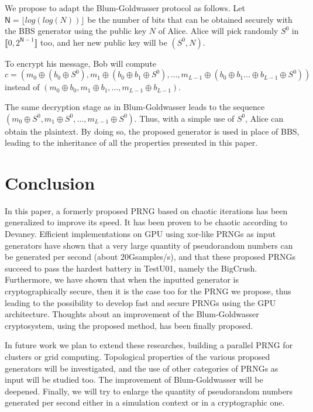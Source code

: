 \documentclass{article}
\begin{document}
We propose to adapt the Blum-Goldwasser protocol as follows. 
Let $\mathsf{N} = \lfloor log(log(N)) \rfloor$ be the number of bits that can
be obtained securely with the BBS generator using the public key $N$ of Alice.
Alice will pick randomly $S^0$ in $\llbracket 0, 2^{\mathsf{N}-1}\rrbracket$ too, and
her new public key will be $(S^0, N)$.

To encrypt his message, Bob will compute
\begin{equation}
c = \left(m_0 \oplus (b_0 \oplus S^0), m_1 \oplus (b_0 \oplus b_1 \oplus S^0), \hdots, m_{L-1} \oplus (b_0 \oplus b_1 \hdots \oplus b_{L-1} \oplus S^0) \right)
\end{equation}
instead of $\left(m_0 \oplus b_0, m_1 \oplus b_1, \hdots, m_{L-1} \oplus b_{L-1} \right)$. 

The same decryption stage as in Blum-Goldwasser leads to the sequence 
$\left(m_0 \oplus S^0, m_1 \oplus S^0, \hdots, m_{L-1} \oplus S^0 \right)$.
Thus, with a simple use of $S^0$, Alice can obtain the plaintext.
By doing so, the proposed generator is used in place of BBS, leading to
the inheritance of all the properties presented in this paper.

\section{Conclusion}


In  this  paper, a formerly proposed PRNG based on chaotic iterations
has been generalized to improve its speed. It has been proven to be
chaotic according to Devaney.
Efficient implementations on  GPU using xor-like  PRNGs as input generators
have shown that a very large quantity of pseudorandom numbers can be generated per second (about
20Gsamples/s), and that these proposed PRNGs succeed to pass the hardest battery in TestU01,
namely the BigCrush.
Furthermore, we have shown that when the inputted generator is cryptographically
secure, then it is the case too for the PRNG we propose, thus leading to
the possibility to develop fast and secure PRNGs using the GPU architecture.
Thoughts about an improvement of the Blum-Goldwasser cryptosystem, using the 
proposed method, has been finally proposed.

In future  work we plan to extend these researches, building a parallel PRNG for  clusters or
grid computing. Topological properties of the various proposed generators will be investigated,
and the use of other categories of PRNGs as input will be studied too. The improvement
of Blum-Goldwasser will be deepened. Finally, we
will try to enlarge the quantity of pseudorandom numbers generated per second either
in a simulation context or in a cryptographic one.



 

\end{document}
